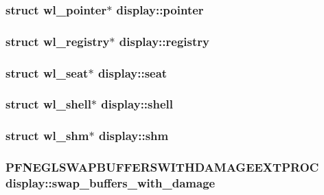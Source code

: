 \hypertarget{structdisplay_acf252129525edb52af1883ed10267754}{
\subsubsection[{pointer}]{\setlength{\rightskip}{0pt plus 5cm}struct wl\-\_\-pointer$\ast$ display\-::pointer}}\label{structdisplay_acf252129525edb52af1883ed10267754}
\hypertarget{structdisplay_a925781323f5c8eb84ef2225ed129de4b}{
\subsubsection[{registry}]{\setlength{\rightskip}{0pt plus 5cm}struct wl\-\_\-registry$\ast$ display\-::registry}}\label{structdisplay_a925781323f5c8eb84ef2225ed129de4b}
\hypertarget{structdisplay_a9dd8fd9967beb6b3767bd93011373bb8}{
\subsubsection[{seat}]{\setlength{\rightskip}{0pt plus 5cm}struct wl\-\_\-seat$\ast$ display\-::seat}}\label{structdisplay_a9dd8fd9967beb6b3767bd93011373bb8}
\hypertarget{structdisplay_a316cfc51e87338b2488233f5d96bd395}{
\subsubsection[{shell}]{\setlength{\rightskip}{0pt plus 5cm}struct wl\-\_\-shell$\ast$ display\-::shell}}\label{structdisplay_a316cfc51e87338b2488233f5d96bd395}
\hypertarget{structdisplay_abb74b6ec549463cfd4b76f26b81b0309}{
\subsubsection[{shm}]{\setlength{\rightskip}{0pt plus 5cm}struct wl\-\_\-shm$\ast$ display\-::shm}}\label{structdisplay_abb74b6ec549463cfd4b76f26b81b0309}
\hypertarget{structdisplay_a48c46c118e4765ef06596f6341c8f23f}{
\subsubsection[{swap\-\_\-buffers\-\_\-with\-\_\-damage}]{\setlength{\rightskip}{0pt plus 5cm}P\-F\-N\-E\-G\-L\-S\-W\-A\-P\-B\-U\-F\-F\-E\-R\-S\-W\-I\-T\-H\-D\-A\-M\-A\-G\-E\-E\-X\-T\-P\-R\-O\-C display\-::swap\-\_\-buffers\-\_\-with\-\_\-damage}}\label{structdisplay_a48c46c118e4765ef06596f6341c8f23f}
